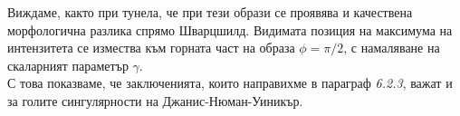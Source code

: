 Виждаме, както при тунела, че при тези образи се проявява и качествена морфологична разлика спрямо Шварцшилд. Видимата позиция на максимума на интензитета се измества към горната част на образа $\phi = \pi / 2$, с намаляване на скаларният параметър $\gamma$.\\

С това показваме, че заключенията, които направихме в параграф \emph{6.2.3}, важат и за голите сингулярности на Джанис-Нюман-Уиникър.